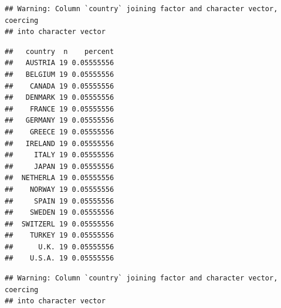 \documentclass[]{gitbook}
\newenvironment{Shaded}{\begin{snugshade}}{\end{snugshade}}
\newcommand{\DataTypeTok}[1]{\textcolor[rgb]{0.13,0.29,0.53}{#1}}
\newcommand{\KeywordTok}[1]{\textcolor[rgb]{0.13,0.29,0.53}{\textbf{#1}}}
\newcommand{\NormalTok}[1]{#1}
\newcommand{\OperatorTok}[1]{\textcolor[rgb]{0.81,0.36,0.00}{\textbf{#1}}}
\newcommand{\StringTok}[1]{\textcolor[rgb]{0.31,0.60,0.02}{#1}}
\theoremstyle{definition}
\theoremstyle{definition}
\theoremstyle{definition}
\theoremstyle{remark}
\begin{document}
\begin{Shaded}
\end{Shaded}

\begin{verbatim}
## Warning: Column `country` joining factor and character vector, coercing
## into character vector
\end{verbatim}

\begin{Shaded}
\end{Shaded}

\begin{verbatim}
##   country  n    percent
##   AUSTRIA 19 0.05555556
##   BELGIUM 19 0.05555556
##    CANADA 19 0.05555556
##   DENMARK 19 0.05555556
##    FRANCE 19 0.05555556
##   GERMANY 19 0.05555556
##    GREECE 19 0.05555556
##   IRELAND 19 0.05555556
##     ITALY 19 0.05555556
##     JAPAN 19 0.05555556
##  NETHERLA 19 0.05555556
##    NORWAY 19 0.05555556
##     SPAIN 19 0.05555556
##    SWEDEN 19 0.05555556
##  SWITZERL 19 0.05555556
##    TURKEY 19 0.05555556
##      U.K. 19 0.05555556
##    U.S.A. 19 0.05555556
\end{verbatim}

\begin{Shaded}
\end{Shaded}

\begin{verbatim}
## Warning: Column `country` joining factor and character vector, coercing
## into character vector
\end{verbatim}

\begin{Shaded}
\end{Shaded}
\end{document}
